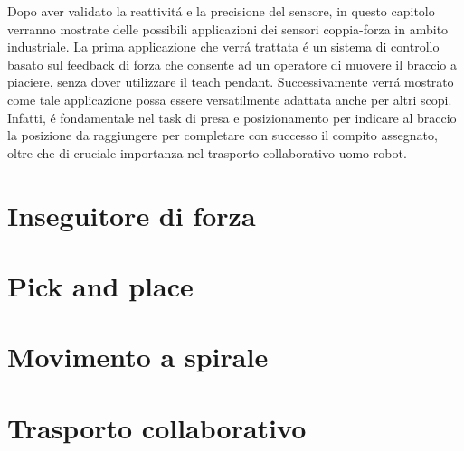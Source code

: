 Dopo aver validato la reattivit\'{a} e la precisione del sensore, in questo capitolo verranno mostrate delle possibili applicazioni 
dei sensori coppia-forza in ambito industriale. 
La prima applicazione che verr\'{a} trattata \'{e} un sistema di controllo basato sul feedback di forza che consente ad un 
operatore di muovere il braccio a piaciere, senza dover utilizzare 
il teach pendant. Successivamente verr\'{a} mostrato come tale applicazione possa essere versatilmente adattata anche per altri scopi. 
Infatti, \'{e} fondamentale nel task di presa e posizionamento per indicare al braccio la posizione da raggiungere per completare 
con successo il compito assegnato, oltre che di cruciale importanza nel trasporto collaborativo uomo-robot. 

\section{Inseguitore di forza} \label{sec:force_follower}


\section{Pick and place} \label{sec:pick_place}


\section{Movimento a spirale}


\section{Trasporto collaborativo}
